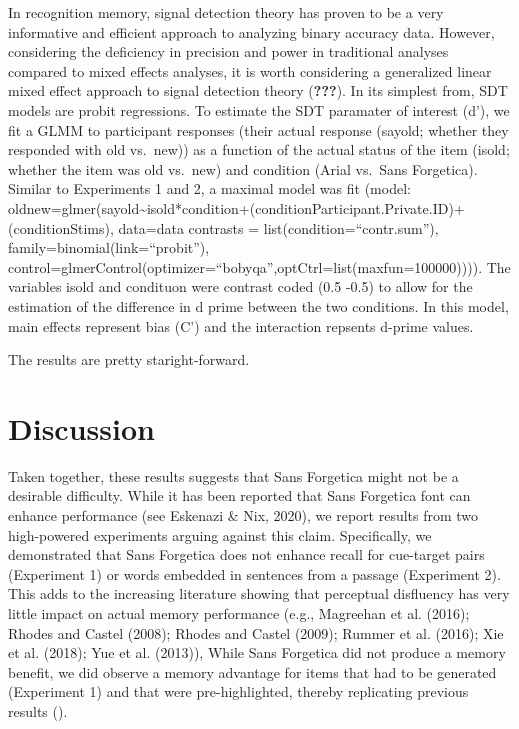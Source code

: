 \documentclass[english,pdf]{apa6}
\begin{document}
In recognition memory, signal detection theory has proven to be a very informative and efficient approach to analyzing binary accuracy data. However, considering the deficiency in precision and power in traditional analyses compared to mixed effects analyses, it is worth considering a generalized linear mixed effect approach to signal detection theory ({\textbf{???}}). In its simplest from, SDT models are probit regressions. To estimate the SDT paramater of interest (d'), we fit a GLMM to participant responses (their actual response (sayold; whether they responded with old vs.~new)) as a function of the actual status of the item (isold; whether the item was old vs.~new) and condition (Arial vs.~Sans Forgetica). Similar to Experiments 1 and 2, a maximal model was fit (model: oldnew=glmer(sayold\textasciitilde{}isold*condition+(condition\textbar{}Participant.Private.ID)+ (condition\textbar{}Stims), data=data contrasts = list(condition=\enquote{contr.sum}), family=binomial(link=\enquote{probit}), control=glmerControl(optimizer=\enquote{bobyqa},optCtrl=list(maxfun=100000)))). The variables isold and condituon were contrast coded (0.5 -0.5) to allow for the estimation of the difference in d prime between the two conditions. In this model, main effects represent bias (C') and the interaction repsents d-prime values.

The results are pretty staright-forward.

\hypertarget{discussion}{%
\section{Discussion}\label{discussion}}

Taken together, these results suggests that Sans Forgetica might not be a desirable difficulty. While it has been reported that Sans Forgetica font can enhance performance (see Eskenazi \& Nix, 2020), we report results from two high-powered experiments arguing against this claim. Specifically, we demonstrated that Sans Forgetica does not enhance recall for cue-target pairs (Experiment 1) or words embedded in sentences from a passage (Experiment 2). This adds to the increasing literature showing that perceptual disfluency has very little impact on actual memory performance (e.g., Magreehan et al. (2016); Rhodes and Castel (2008); Rhodes and Castel (2009); Rummer et al. (2016); Xie et al. (2018); Yue et al. (2013)), While Sans Forgetica did not produce a memory benefit, we did observe a memory advantage for items that had to be generated (Experiment 1) and that were pre-highlighted, thereby replicating previous results ().
\end{document}
